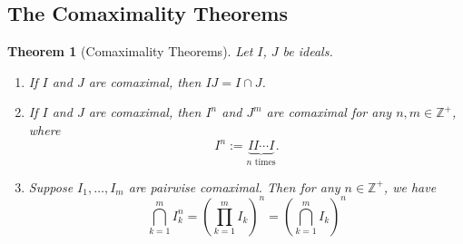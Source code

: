 \documentclass[12pt]{article}
\newcommand{\z}{\mathbb{Z}}
\newtheorem{theorem}{Theorem}[section]
\theoremstyle{definition}
\begin{document}
\subsection{The Comaximality Theorems}
\begin{theorem}[Comaximality Theorems]
    Let $I$, $J$ be ideals.
    \begin{enumerate}[1)]
        \item If $I$ and $J$ are comaximal, then $IJ=I\cap J$.
        \item If $I$ and $J$ are comaximal, then $I^n$ and $J^m$ are comaximal for any $n,m\in\z^+$, where 
        \begin{equation}
            I^n:=\underbrace{II\dotsm I}_{n\text{ times}}.
        \end{equation}
        \item Suppose $I_1,\dotsc,I_m$ are pairwise comaximal. Then for any $n\in\z^+$, we have
        \begin{equation}
            \bigcap\limits_{k=1}^mI_k^n=\left(\prod\limits_{k=1}^mI_k\right)^n=\left(\bigcap\limits_{k=1}^mI_k\right)^n
        \end{equation}
    \end{enumerate}
\end{theorem}
\end{document}
